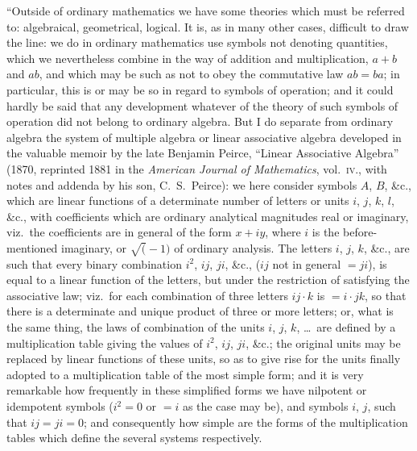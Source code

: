 \documentclass[11pt]{article}
\begin{document}
``Outside of ordinary mathematics we have some theories which must be referred to: algebraical, geometrical, logical. It is, as in many other cases, difficult to draw the line: we do in ordinary mathematics use symbols not denoting quantities, which we nevertheless combine in the way of addition and multiplication, $a + b$ and $ab$, and which may be such as not to obey the commutative law $ab = ba$; in particular, this is or may be so in regard to symbols of operation; and it could hardly be said that any development whatever of the theory of such symbols of operation did not belong to ordinary algebra. But I do separate from ordinary algebra the system of multiple algebra or linear associative algebra developed in the valuable memoir by the late Benjamin Peirce, ``Linear Associative Algebra'' (1870, reprinted 1881 in the \textit{American Journal of Mathematics}, vol.~\textsc{iv}., with notes and addenda by his son, C.~S.~Peirce): we here consider symbols $A$, $B$, \&c., which are linear functions of a determinate number of letters or units $i$, $j$, $k$, $l$, \&c., with coefficients which are ordinary analytical magnitudes real or imaginary, viz.\ the coefficients are in general of the form $x + iy$, where $i$ is the before-mentioned imaginary, or $\surd(-1)$ of ordinary analysis. The letters $i$, $j$, $k$, \&c., are such that every binary combination $i^{2}$, $ij$, $ji$, \&c., ($ij$ not in general $= ji$), is equal to a linear function of the letters, but under the restriction of satisfying the associative law; viz.\ for each combination of three letters $ij\cdot k$ is $= i\cdot jk$, so that there is a determinate and unique product of three or more letters; or, what is the same thing, the laws of combination of the units $i$, $j$, $k$, \ldots\ are defined by a multiplication table giving the values of $i^{2}$, $ij$, $ji$, \&c.; the original units may be replaced by linear functions of these units, so as to give rise for the units finally adopted to a multiplication table of the most simple form; and it is very remarkable how frequently in these simplified forms we have nilpotent or idempotent symbols ($i^{2} = 0$ or $= i$ as the case may be), and symbols $i$, $j$, such that $ij = ji = 0$; and consequently how simple are the forms of the multiplication tables which define the several systems respectively.
\end{document}
